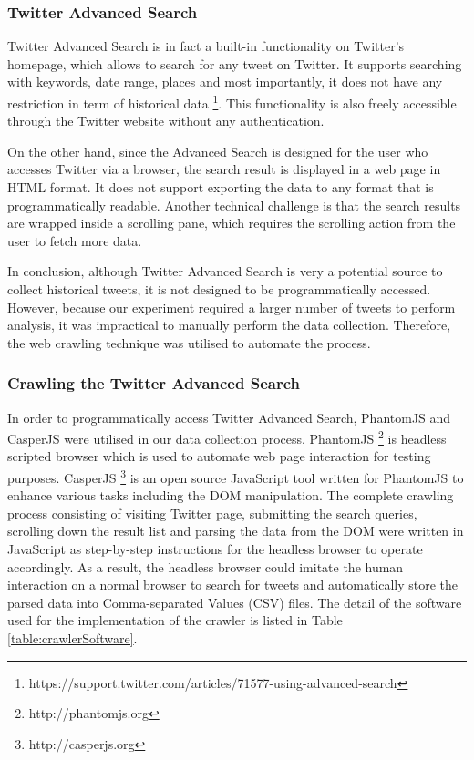\subsubsection{Twitter Advanced Search}
Twitter Advanced Search is in fact a built-in functionality on Twitter's homepage, which allows to search for any tweet on Twitter. It supports searching with keywords, date range, places and most importantly, it does not have any restriction in term of historical data \footnote{https://support.twitter.com/articles/71577-using-advanced-search}. This functionality is also freely accessible through the Twitter website without any authentication.

On the other hand, since the Advanced Search is designed for the user who accesses Twitter via a browser, the search result is displayed in a web page in HTML format. It does not support exporting the data to any format that is programmatically readable. Another technical challenge is that the search results are wrapped inside a scrolling pane, which requires the scrolling action from the user to fetch more data. 

In conclusion, although Twitter Advanced Search is very a potential source to collect historical tweets, it is not designed to be programmatically accessed. However, because our experiment required a larger number of tweets to perform analysis, it was impractical to manually perform the data collection. Therefore, the web crawling technique was utilised to automate the process.

\subsubsection{Crawling the Twitter Advanced Search}
In order to programmatically access Twitter Advanced Search, PhantomJS and CasperJS were utilised in our data collection process. PhantomJS \footnote{http://phantomjs.org} is headless scripted browser which is used to automate web page interaction for testing purposes. CasperJS \footnote{http://casperjs.org} is an open source JavaScript tool written for PhantomJS to enhance various tasks including the DOM manipulation. The complete crawling process consisting of visiting Twitter page, submitting the search queries, scrolling down the result list and parsing the data from the DOM were written in JavaScript as step-by-step instructions for the headless browser to operate accordingly. As a result, the headless browser could imitate the human interaction on a normal browser to search for tweets and automatically store the parsed data into Comma-separated Values (CSV) files. The detail of the software used for the implementation of the crawler is listed in Table \ref{table:crawlerSoftware}.


